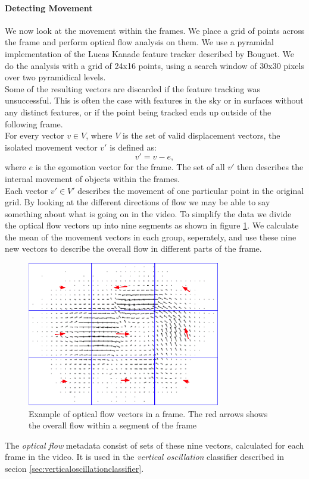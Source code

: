 \paragraph{Detecting Movement}
%
We now look at the movement within the frames. We place a grid of points across the frame and perform optical flow analysis on them. We use a pyramidal implementation of the Lucas Kanade feature tracker described by Bouguet\cite{Bouguet2000}. We do the analysis with a grid of 24x16 points, using a search window of 30x30 pixels over two pyramidical levels.\\
Some of the resulting vectors are discarded if the feature tracking was unsuccessful. This is often the case with features in the sky or in surfaces without any distinct features, or if the point being tracked ends up outside of the following frame.\\
For every vector $v \in V$, where $V$ is the set of valid displacement vectors, the isolated movement vector $v'$ is defined as:
\begin{equation}
v' = v - e,
\end{equation}
where $e$ is the egomotion vector for the frame. The set of all $v'$ then describes the internal movement of objects within the frames.\\
Each vector $v' \in V'$ describes the movement of one particular point in the original grid. By looking at the different directions of flow we may be able to say something about what is going on in the video. To simplify the data we divide the optical flow vectors up into nine segments as shown in figure \ref{fig:opticalflow}. We calculate the mean of the movement vectors in each group, seperately, and use these nine new vectors to describe the overall flow in different parts of the frame.
%
\begin{figure}
     \centering
     \includegraphics[width=0.75\textwidth]{img/optical_flow.png}
     \caption{Example of optical flow vectors in a frame. The red arrows shows the overall flow within a segment of the frame}\label{fig:opticalflow}
\end{figure}
%
The \textit{optical flow} metadata consist of sets of these nine vectors, calculated for each frame in the video. It is used in the \textit{vertical oscillation} classifier described in secion \ref{sec:verticaloscillationclassifier}.
%
